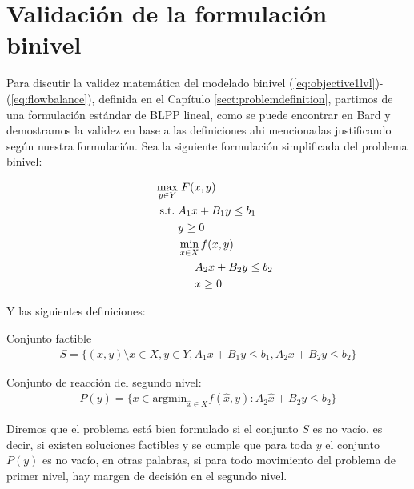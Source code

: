 \chapter{Validación de la formulación binivel}
\label{sect:apendixbilevelvalidation}

Para discutir la validez matemática del modelado binivel (\ref{eq:objective1lvl})-(\ref{eq:flowbalance}), definida en el Capítulo \ref{sect:problemdefinition}, partimos de una formulación estándar de BLPP lineal, como se puede encontrar en Bard \cite{bardbook} y demostramos la validez en base a las definiciones ahi mencionadas justificando según nuestra formulación. Sea la siguiente formulación simplificada del problema binivel:

\begin{align}
\max_{y \in Y}            & \; F(x, y) \label{bilevelgeneric1} \\
\hspace{1.5em} \text{s.t.}\; & A_1 x + B_1 y \leq b_1 \\
                          & y \geq 0 \\
                          & \min_{x \in X} f(x, y) \\
                          & \hspace{1.5em} A_2 x + B_2 y \leq b_2 \label{bilevelgeneric5} \\
                          & \hspace{1.5em} x \geq 0 \label{bilevelgeneric6}
\end{align}

Y las siguientes definiciones:

\begin{definition}
Conjunto factible
\begin{align}
  S = \{(x, y) \setminus x \in X, y \in Y, A_1 x + B_1 y \leq b_1, A_2 x + B_2 y \leq b_2 \}
\end{align}
\end{definition}

\begin{definition}
Conjunto de reacción del segundo nivel:
\begin{align}
  P(y) = \{ x \in \text{argmin}_{\hat{x} \in X} f(\hat{x}, y) : A_2 \hat{x} + B_2 y \leq b_2 \}
\end{align}
\end{definition}

Diremos que el problema está bien formulado si el conjunto $S$ es no vacío, es decir, si existen soluciones factibles y se cumple que para toda $y$ el conjunto $P(y)$ es no vacío, en otras palabras, si para todo movimiento del problema de primer nivel, hay margen de decisión en el segundo nivel.

